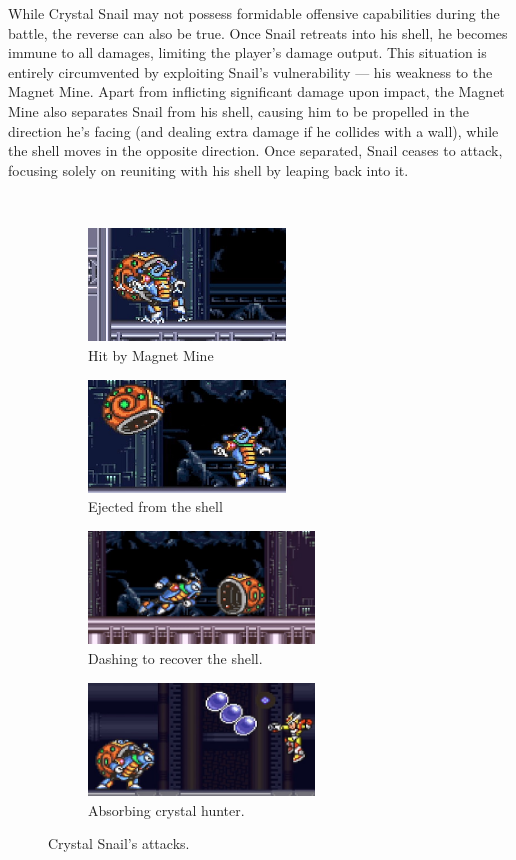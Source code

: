 While Crystal Snail may not possess formidable offensive capabilities during the battle, the reverse can also be true. Once Snail retreats into his shell, he becomes immune to all damages, limiting the player's damage output. This situation is entirely circumvented by exploiting Snail's vulnerability — his weakness to the Magnet Mine. Apart from inflicting significant damage upon impact, the Magnet Mine also separates Snail from his shell, causing him to be propelled in the direction he's facing (and dealing extra damage if he collides with a wall), while the shell moves in the opposite direction. Once separated, Snail ceases to attack, focusing solely on reuniting with his shell by leaping back into it.
\begin{figure}[htp]
	\centering
	\ContinuedFloat\
	\begin{subfigure}{0.45\linewidth}
		\centering
		\includegraphics[height=3cm]{figures/X2/Crystal_snail/Crystal_weakness.png}
		\caption{Hit by Magnet Mine}
	\end{subfigure}
	\begin{subfigure}{0.45\linewidth}
		\centering
		\includegraphics[height=3cm]{figures/X2/Crystal_snail/Crystal_weakness_2.png}
		\caption{Ejected from the shell}
	\end{subfigure}
	\begin{subfigure}{0.49\linewidth}
		\centering
		\includegraphics[height=3cm]{figures/X2/Crystal_snail/Crystal_no_shell.png}
		\caption{Dashing to recover the shell.}
	\end{subfigure}
	\begin{subfigure}{0.49\linewidth}
		\centering
		\includegraphics[height=3cm]{figures/X2/Crystal_snail/Crystal_hunter_absorb.png}
		\caption{Absorbing crystal hunter.}
	\end{subfigure}
	\caption{Crystal Snail's attacks.}	
\end{figure}
